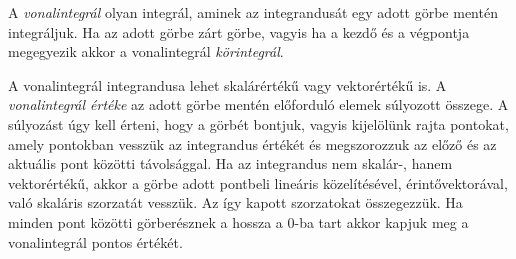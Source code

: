 \documentclass[%
	DIV=15,appendixprefix]{scrreprt}
\theoremstyle{definition}
\theoremstyle{remark}
\begin{document}
A \emph{vonalintegrál} olyan integrál, aminek az integrandusát egy adott görbe mentén integráljuk.
Ha az adott görbe zárt görbe, vagyis ha a kezdő és a végpontja megegyezik akkor a vonalintegrál
\emph{körintegrál}.

A vonalintegrál integrandusa lehet skalárértékű vagy vektorértékű is. A \emph{vonalintegrál
értéke} az adott görbe mentén előforduló elemek súlyozott összege. A súlyozást úgy kell érteni, hogy
a görbét  bontjuk, vagyis kijelölünk rajta pontokat, amely pontokban vesszük az
integrandus értékét és megszorozzuk az előző és az aktuális pont közötti távolsággal. Ha az
integrandus nem skalár-, hanem vektorértékű, akkor a görbe adott pontbeli lineáris közelítésével,
érintővektorával, való skaláris szorzatát vesszük. Az így kapott szorzatokat összegezzük. Ha minden
pont közötti görberésznek a hossza a 0-ba tart akkor kapjuk meg a vonalintegrál pontos értékét.
\end{document}
